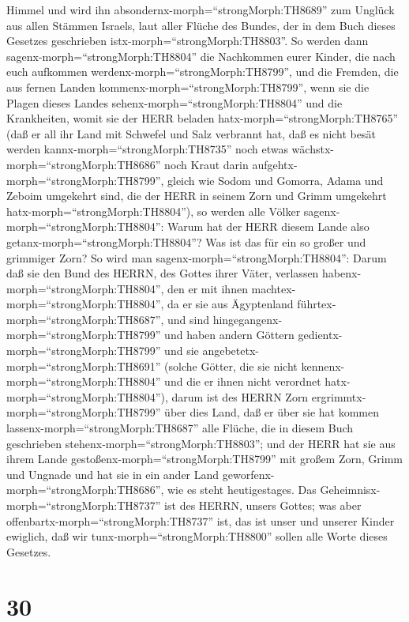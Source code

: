 Himmel  und wird ihn
absondernx-morph=``strongMorph:TH8689'' zum Unglück aus allen Stämmen
Israels, laut aller Flüche des Bundes, der in dem Buch dieses Gesetzes
geschrieben istx-morph=``strongMorph:TH8803''.  So werden
dann sagenx-morph=``strongMorph:TH8804'' die Nachkommen eurer Kinder,
die nach euch aufkommen werdenx-morph=``strongMorph:TH8799'', und die
Fremden, die aus fernen Landen kommenx-morph=``strongMorph:TH8799'',
wenn sie die Plagen dieses Landes sehenx-morph=``strongMorph:TH8804''
und die Krankheiten, womit sie der HERR beladen
hatx-morph=``strongMorph:TH8765''  (daß er all ihr Land mit
Schwefel und Salz verbrannt hat, daß es nicht besät werden
kannx-morph=``strongMorph:TH8735'' noch etwas
wächstx-morph=``strongMorph:TH8686'' noch Kraut darin
aufgehtx-morph=``strongMorph:TH8799'', gleich wie Sodom und Gomorra,
Adama und Zeboim umgekehrt sind, die der HERR in seinem Zorn und Grimm
umgekehrt hatx-morph=``strongMorph:TH8804''),  so werden
alle Völker sagenx-morph=``strongMorph:TH8804'': Warum hat der HERR
diesem Lande also getanx-morph=``strongMorph:TH8804''? Was ist das für
ein so großer und grimmiger Zorn?  So wird man
sagenx-morph=``strongMorph:TH8804'': Darum daß sie den Bund des HERRN,
des Gottes ihrer Väter, verlassen habenx-morph=``strongMorph:TH8804'',
den er mit ihnen machtex-morph=``strongMorph:TH8804'', da er sie aus
Ägyptenland führtex-morph=``strongMorph:TH8687'',  und sind
hingegangenx-morph=``strongMorph:TH8799'' und haben andern Göttern
gedientx-morph=``strongMorph:TH8799'' und sie
angebetetx-morph=``strongMorph:TH8691'' (solche Götter, die sie nicht
kennenx-morph=``strongMorph:TH8804'' und die er ihnen nicht verordnet
hatx-morph=``strongMorph:TH8804''),  darum ist des HERRN
Zorn ergrimmtx-morph=``strongMorph:TH8799'' über dies Land, daß er über
sie hat kommen lassenx-morph=``strongMorph:TH8687'' alle Flüche, die in
diesem Buch geschrieben stehenx-morph=``strongMorph:TH8803'';
 und der HERR hat sie aus ihrem Lande
gestoßenx-morph=``strongMorph:TH8799'' mit großem Zorn, Grimm und
Ungnade und hat sie in ein ander Land
geworfenx-morph=``strongMorph:TH8686'', wie es steht heutigestages.
 Das Geheimnisx-morph=``strongMorph:TH8737'' ist des HERRN,
unsers Gottes; was aber offenbartx-morph=``strongMorph:TH8737'' ist, das
ist unser und unserer Kinder ewiglich, daß wir
tunx-morph=``strongMorph:TH8800'' sollen alle Worte dieses Gesetzes.

\hypertarget{section-29}{%
\section{30}\label{section-29}}

